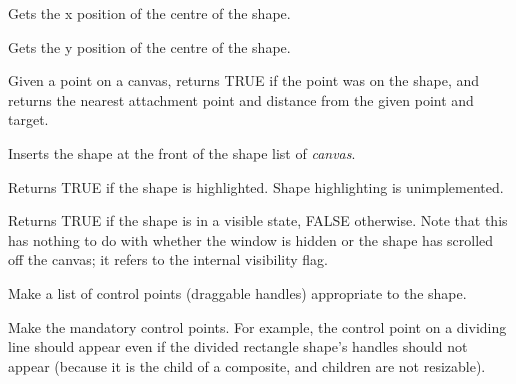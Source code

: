 Gets the x position of the centre of the shape.



Gets the y position of the centre of the shape.



Given a point on a canvas, returns TRUE if the point was on the shape, and returns
the nearest attachment point and distance from the given point and target.



Inserts the shape at the front of the shape list of {\it canvas}.



Returns TRUE if the shape is highlighted. Shape highlighting is unimplemented.



Returns TRUE if the shape is in a visible state, FALSE otherwise. Note
that this has nothing to do with whether the window is hidden or the
shape has scrolled off the canvas; it refers to the internal
visibility flag.



Make a list of control points (draggable handles) appropriate to the shape.



Make the mandatory control points. For example, the control point on a dividing line should
appear even if the divided rectangle shape's handles should not appear (because it is the child of
a composite, and children are not resizable).

\label{wxshapemove}


